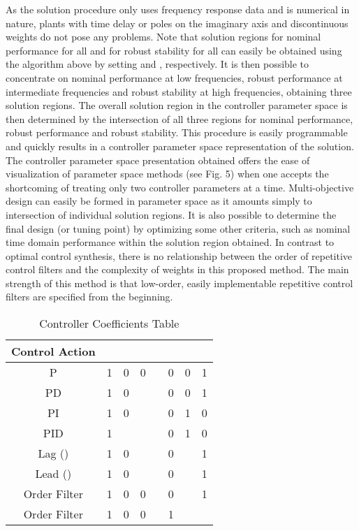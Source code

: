\documentclass[12pt,draftcls,onecolumn]{IEEEtran}
\begin{document}
As the solution procedure only uses frequency response data and is numerical in nature, plants with time delay or poles on the imaginary axis and discontinuous weights do not pose any problems. Note that solution regions for nominal performance  for all  and for robust stability  for all  can easily be obtained using the algorithm above
by setting  and , respectively. It is then possible to concentrate on nominal performance at low frequencies,
robust performance at intermediate frequencies and robust stability at high frequencies, obtaining three solution regions.
The overall solution region in the controller parameter space is then determined by the intersection of all three regions for
nominal performance, robust performance and robust stability. This procedure is easily programmable and quickly results in a
controller parameter space representation of the solution. The controller parameter space presentation obtained offers the ease
of visualization of parameter space methods (see Fig. 5) when one accepts the shortcoming of treating only two controller parameters
at a time. Multi-objective design can easily be formed in parameter space as it amounts simply to intersection of individual
solution regions. It is also possible to determine the final design (or tuning point) by optimizing some other criteria, such
as nominal time domain performance within the solution region obtained. In contrast to  optimal control synthesis,
there is no relationship between the order of repetitive control filters and the complexity of weights in this proposed method. The
main strength of this method is that low-order, easily implementable repetitive control filters are specified from the beginning.

\begin{table}[!t]
\renewcommand{\arraystretch}{1.3}
\caption{Controller Coefficients Table} \label{table_example}
\centering
\begin{tabular}{c||c||c||c||c||c||c||c}
\hline
\bfseries Control Action & \bfseries  & \bfseries  & \bfseries  & \bfseries  & \bfseries  & \bfseries  & \bfseries \\
\hline\hline
P & 1 & 0 & 0 &  & 0 & 0 & 1 \\
\hline
PD & 1 & 0 &  &  & 0 & 0 & 1 \\
\hline
PI & 1 & 0 &  &  & 0 & 1 & 0 \\
\hline
PID & 1 &  &  &  & 0 & 1 & 0 \\
\hline
Lag () & 1 & 0 &  &  & 0 &  & 1 \\
\hline
Lead () & 1 & 0 &  &  & 0 &  & 1 \\
\hline
 Order Filter & 1 & 0 & 0 &  & 0 &  & 1 \\
\hline
 Order Filter & 1 & 0 & 0 &  & 1 &  &  \\
\hline
\end{tabular}
\end{table}
\end{document}
